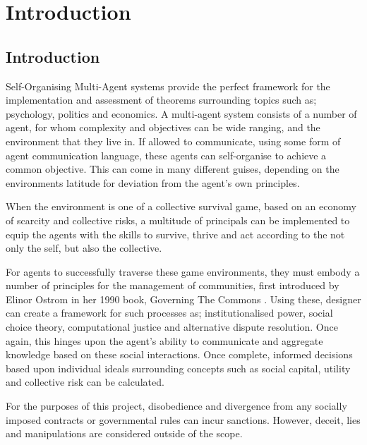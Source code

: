 \chapter{Introduction}\label{introduction}

\section{Introduction}\label{sec:intro}
Self-Organising Multi-Agent systems provide the perfect framework for the implementation and assessment of theorems surrounding topics such as; psychology, politics and economics. A multi-agent system consists of a number of agent, for whom complexity and objectives can be wide ranging, and the environment that they live in. If allowed to communicate, using some form of agent communication language, these agents can self-organise to achieve a common objective. This can come in many different guises, depending on the environments latitude for deviation from the agent's own principles. 

When the environment is one of a collective survival game, based on an economy of scarcity and collective risks, a multitude of principals can be implemented to equip the agents with the skills to survive, thrive and act according to the not only the self, but also the collective. 

For agents to successfully traverse these game environments, they must embody a number of principles for the management of communities, first introduced by Elinor Ostrom in her 1990 book, Governing The Commons \cite{ostrom2015governing}. Using these, designer can create a framework for such processes as; institutionalised power, social choice theory, computational justice and alternative dispute resolution. Once again, this hinges upon the agent's ability to communicate and aggregate knowledge based on these social interactions. Once complete, informed decisions based upon individual ideals surrounding concepts such as social capital, utility and collective risk can be calculated.

For the purposes of this project, disobedience and divergence from any socially imposed contracts or governmental rules can incur sanctions. However, deceit, lies and manipulations are considered outside of the scope. 

